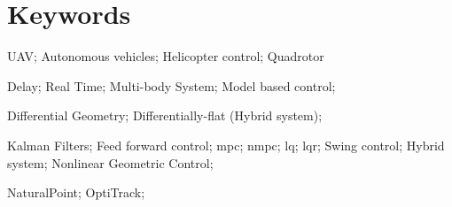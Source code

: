 \chapter*{Keywords}

UAV; Autonomous vehicles; Helicopter control; Quadrotor

Delay; Real Time; Multi-body System;  Model based control;

Differential Geometry; Differentially-flat (Hybrid system);

Kalman Filters; Feed forward control; \ac{mpc}; \ac{nmpc}; \ac{lq}; \ac{lqr}; Swing control; Hybrid system; Nonlinear Geometric Control;

NaturalPoint; OptiTrack; 
